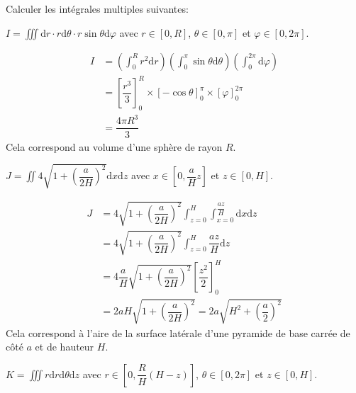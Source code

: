 \debutEntrainement
Calculer les intégrales multiples suivantes:

\begin{enonce}
$I=\iiint\mathrm{d}r\cdot r\mathrm{d}\theta\cdot r\sin\theta\mathrm{d}\varphi$
avec $r\in\left[0,R\right]$, $\theta\in\left[0,\pi\right]$ et $\varphi\in\left[0,2\pi\right]$.
\end{enonce}
%
\begin{corrige}
\begin{align*}
I & =\left(\int_{0}^{R}r^{2}\mathrm{d}r\right)\left(\int_{0}^{\pi}\sin\theta\mathrm{d}\theta\right)\left(\int_{0}^{2\pi}\mathrm{d}\varphi\right)\\
 & =\left[\dfrac{r^{3}}{3}\right]_{0}^{R}\times\left[-\cos\theta\right]_{0}^{\pi}\times\left[\varphi\right]_{0}^{2\pi}\\
 & =\dfrac{4\pi R^{3}}{3}
\end{align*}
Cela correspond au volume d'une sphère de rayon $R$.
\end{corrige}
\begin{enonce}
$J=\iint4\sqrt{1+\left(\dfrac{a}{2H}\right)^{2}}\mathrm{d}x\mathrm{d}z$
avec $x\in\left[0,\dfrac{a}{H}z\right]$ et $z\in\left[0,H\right]$.
\end{enonce}
%
\begin{corrige}
\begin{align*}
J & =4\sqrt{1+\left(\dfrac{a}{2H}\right)^{2}}\int_{z=0}^{H}\int_{x=0}^{\dfrac{az}{H}}\mathrm{d}x\mathrm{d}z\\
 & =4\sqrt{1+\left(\dfrac{a}{2H}\right)^{2}}\int_{z=0}^{H}\dfrac{az}{H}\mathrm{d}z\\
 & =4\dfrac{a}{H}\sqrt{1+\left(\dfrac{a}{2H}\right)^{2}}\left[\dfrac{z^{2}}{2}\right]_{0}^{H}\\
 & =2aH\sqrt{1+\left(\dfrac{a}{2H}\right)^{2}}=2a\sqrt{H^{2}+\left(\dfrac{a}{2}\right)^{2}}
\end{align*}
Cela correspond à l'aire de la surface latérale d'une pyramide de
base carrée de côté $a$ et de hauteur $H$.
\end{corrige}
\begin{enonce}
$K=\iiint r\mathrm{d}r\mathrm{d}\theta\mathrm{d}z$ avec $r\in\left[0,\dfrac{R}{H}\left(H-z\right)\right]$,
$\theta\in\left[0,2\pi\right]$ et $z\in\left[0,H\right]$.
\end{enonce}

